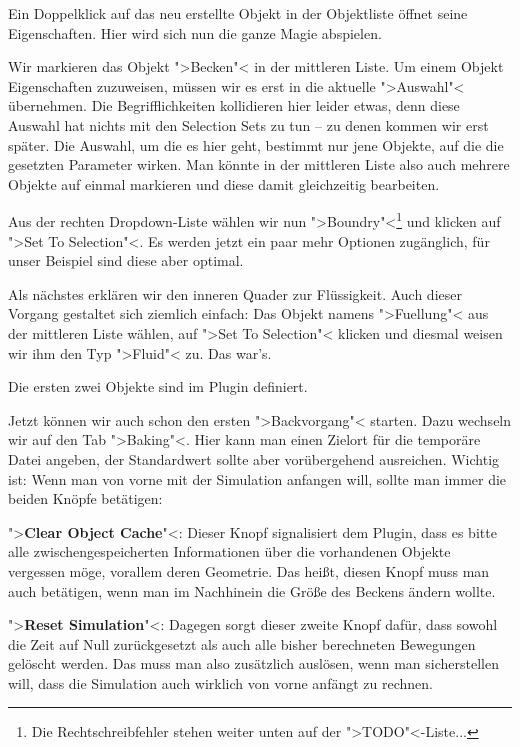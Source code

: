 \documentclass[10pt,DIV=14,a4paper]{scrartcl}
\begin{document}
Ein Doppelklick auf das neu erstellte Objekt in der Objektliste öffnet
seine Eigenschaften. Hier wird sich nun die ganze Magie abspielen.

Wir markieren das Objekt ">Becken"< in der mittleren
Liste. Um einem
Objekt Eigenschaften zuzuweisen, müssen wir es erst in die aktuelle
">Auswahl"< übernehmen. Die Begrifflichkeiten kollidieren hier leider
etwas, denn diese Auswahl hat nichts mit den Selection Sets zu tun -- zu
denen kommen wir erst später. Die Auswahl, um die es hier geht, bestimmt
nur jene Objekte, auf die die gesetzten Parameter wirken. Man könnte in
der mittleren Liste also auch mehrere Objekte auf einmal markieren und
diese damit gleichzeitig bearbeiten.

Aus der rechten Dropdown-Liste wählen wir nun ">Boundry"<\footnote{Die
Rechtschreibfehler stehen weiter unten auf der ">TODO"<-Liste...} und
klicken auf ">Set To Selection"<. Es werden jetzt ein paar mehr Optionen
zugänglich, für unser Beispiel sind diese aber optimal.

Als nächstes erklären wir den inneren Quader zur
Flüssigkeit. Auch dieser Vorgang gestaltet sich ziemlich
einfach: Das Objekt namens ">Fuellung"< aus der mittleren Liste wählen,
auf ">Set To Selection"< klicken und diesmal weisen wir ihm den Typ
">Fluid"< zu. Das war's.

{Die ersten zwei Objekte sind im Plugin definiert.}

Jetzt können wir auch schon den ersten ">Backvorgang"<
starten. Dazu wechseln wir auf den Tab ">Baking"<. Hier
kann man einen Zielort für die temporäre Datei angeben, der Standardwert
sollte aber vorübergehend ausreichen. Wichtig ist: Wenn man von vorne
mit der Simulation anfangen will, sollte man immer die beiden Knöpfe
betätigen:

\itA
	\item ">\textbf{Clear Object Cache}"<: Dieser Knopf signalisiert dem
	Plugin, dass es bitte alle zwischengespeicherten Informationen über
	die vorhandenen Objekte vergessen möge, vorallem deren Geometrie.
	Das heißt, diesen Knopf muss man auch betätigen, wenn man im
	Nachhinein die Größe des Beckens ändern wollte.

	\item ">\textbf{Reset Simulation}"<: Dagegen sorgt dieser zweite
	Knopf dafür, dass sowohl die Zeit auf Null zurückgesetzt als auch
	alle bisher berechneten Bewegungen gelöscht werden. Das muss man
	also zusätzlich auslösen, wenn man sicherstellen will, dass die
	Simulation auch wirklich von vorne anfängt zu rechnen.
\end{document}
